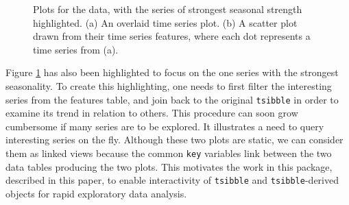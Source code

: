 \begin{Schunk}
\begin{figure}

{\centering {}

}

\caption[Plots for the  data, with the series of strongest seasonal strength highlighted]{Plots for the  data, with the series of strongest seasonal strength highlighted. (a) An overlaid time series plot. (b) A scatter plot drawn from their time series features, where each dot represents a time series from (a).}\label{fig:highlight-retail}
\end{figure}
\end{Schunk}

Figure \ref{fig:highlight-retail} has also been highlighted to focus on
the one series with the strongest seasonality. To create this
highlighting, one needs to first filter the interesting series from the
features table, and join back to the original \texttt{tsibble} in order
to examine its trend in relation to others. This procedure can soon grow
cumbersome if many series are to be explored. It illustrates a need to
query interesting series on the fly. Although these two plots are
static, we can consider them as linked views because the common
\texttt{key} variables link between the two data tables producing the
two plots. This motivates the work in this package, described in this
paper, to enable interactivity of \texttt{tsibble} and
\texttt{tsibble}-derived objects for rapid exploratory data analysis.

